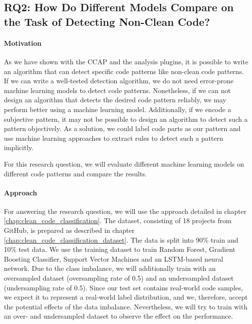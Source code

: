 \subsection{RQ2: How Do Different Models Compare on the Task of Detecting Non-Clean Code?}
\paragraph{Motivation}
As we have shown with the CCAP and the analysis plugins, it is possible to write an algorithm that can detect specific code patterns like non-clean code patterns. If we can write a well-tested detection algorithm, we do not need error-prone machine learning models to detect code patterns. Nonetheless, if we can not design an algorithm that detects the desired code pattern reliably, we may perform better using a machine learning model. Additionally, if we encode a subjective pattern, it may not be possible to design an algorithm to detect such a pattern objectively. As a solution, we could label code parts as our pattern and use machine learning approaches to extract rules to detect such a pattern implicitly.

For this research question, we will evaluate different machine learning models on different code patterns and compare the results.

\paragraph{Approach}
For answering the research question, we will use the approach detailed in chapter \ref{chap:clean_code_classification}.  The dataset, consisting of 18 projects from GitHub, is prepared as described in chapter \ref{chap:clean_code_classification_dataset}. The data is split into 90\% train and 10\% test data. We use the training dataset to train Random Forest, Gradient Boosting Classifier, Support Vector Machines and an LSTM-based neural network. Due to the class imbalance, we will additionally train with an oversampled dataset (oversampling rate of 0.5) and an undersampled dataset (undersampling rate of 0.5). Since our test set contains real-world code samples, we expect it to represent a real-world label distribution, and we, therefore, accept the potential effects of the data imbalance. Nevertheless, we will try to train with an over- and undersampled dataset to observe the effect on the performance.

